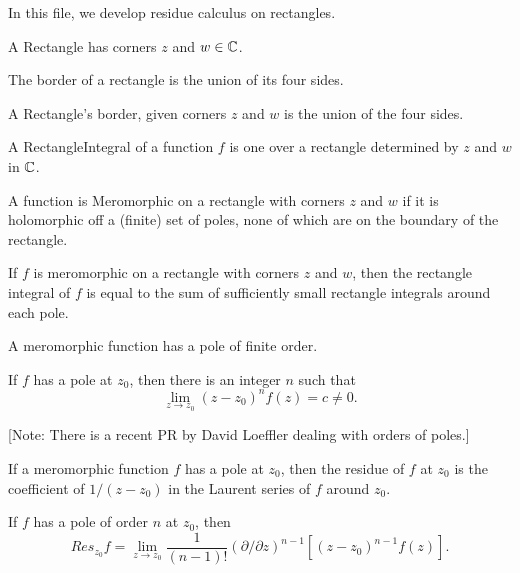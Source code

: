 

In this file, we develop residue calculus on rectangles.

\begin{definition}\label{Rectangle}\leanok
A Rectangle has corners $z$ and $w \in \C$.
\end{definition}



The border of a rectangle is the union of its four sides.
\begin{definition}\label{RectangleBorder}\leanok
A Rectangle's border, given corners $z$ and $w$ is the union of the four sides.
\end{definition}



\begin{definition}\label{RectangleIntegral}\leanok
A RectangleIntegral of a function $f$ is one over a rectangle determined by $z$ and $w$ in $\C$.
\end{definition}



A function is Meromorphic on a rectangle with corners $z$ and $w$ if it is holomorphic off a
(finite) set of poles, none of which are on the boundary of the rectangle.



\begin{theorem}\label{RectangleIntegralEqSumOfRectangles}
If $f$ is meromorphic on a rectangle with corners $z$ and $w$, then the rectangle integral of $f$
is equal to the sum of sufficiently small rectangle integrals around each pole.
\end{theorem}



A meromorphic function has a pole of finite order.
\begin{definition}\label{PoleOrder}
If $f$ has a pole at $z_0$, then there is an integer $n$ such that
$$
\lim_{z\to z_0} (z-z_0)^n f(z) = c \neq 0.
$$
\end{definition}

[Note: There is a recent PR by David Loeffler dealing with orders of poles.]



If a meromorphic function $f$ has a pole at $z_0$, then the residue of $f$ at $z_0$ is the coefficient of $1/(z-z_0)$ in the Laurent series of $f$ around $z_0$.
\begin{definition}\label{Residue}
If $f$ has a pole of order $n$ at $z_0$, then
$$
Res_{z_0} f = \lim_{z\to z_0}\frac1{(n-1)!}(\partial/\partial z)^{n-1}[(z-z_0)^{n-1}f(z)].
$$
\end{definition}



